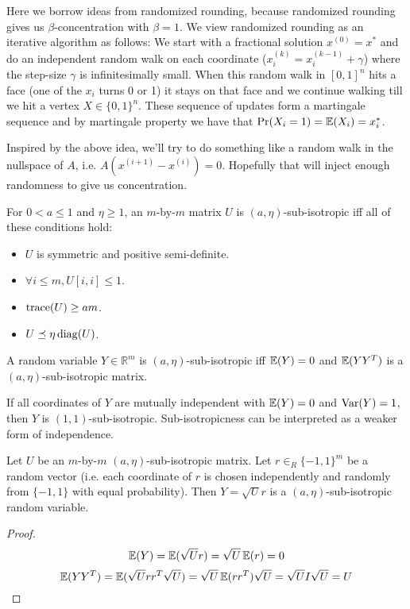 Here we borrow ideas from randomized rounding,
because randomized rounding gives us $\beta$-concentration with $\beta = 1$.
We view randomized rounding as an iterative algorithm as follows:
We start with a fractional solution $x^{(0)} = x^*$ and do an independent random walk
on each coordinate ($x_i^{(k)} = x_i^{(k-1)} + \gamma$)
where the step-size $\gamma$ is infinitesimally small.
When this random walk in $[0,1]^n$ hits a face (one of the $x_i$ turns 0 or 1)
it stays on that face and we continue walking till we hit a vertex $X \in \{0, 1\}^n$.
These sequence of updates form a martingale sequence and by martingale property
we have that $\Pr(X_i = 1) = \operatorname{\mathbb{E}}(X_i) = x_i^*$.

Inspired by the above idea, we'll try to do something like a random walk in the
nullspace of $A$, i.e. $A(x^{(i+1)} - x^{(i)}) = 0$.
Hopefully that will inject enough randomness to give us concentration.

\begin{definition}
For $0 < a \le 1$ and $\eta \ge 1$, an $m$-by-$m$ matrix $U$ is $(a, \eta)$-sub-isotropic
iff all of these conditions hold:
\begin{itemize}
\item $U$ is symmetric and positive semi-definite.
\item $\forall i \le m, U[i, i] \le 1$.
\item $\operatorname*{trace}(U) \ge am$.  %
\item $U \preceq \eta \operatorname*{diag}(U)$.  %
\end{itemize}
\end{definition}

\begin{definition}
A random variable $Y \in \mathbb{R}^m$ is $(a, \eta)$-sub-isotropic iff
$\operatorname{\mathbb{E}}(Y) = 0$ and $\operatorname{\mathbb{E}}(YY^T)$ is a $(a, \eta)$-sub-isotropic matrix.
\end{definition}
If all coordinates of $Y$ are mutually independent with $\operatorname{\mathbb{E}}(Y) = 0$ and $\operatorname*{Var}(Y) = 1$,
then $Y$ is $(1, 1)$-sub-isotropic.
Sub-isotropicness can be interpreted as a weaker form of independence.

\begin{theorem}
Let $U$ be an $m$-by-$m$ $(a, \eta)$-sub-isotropic matrix.
Let $r \in_R \{-1, 1\}^m$ be a random vector
(i.e. each coordinate of $r$ is chosen independently
and randomly from $\{-1, 1\}$ with equal probability).
Then $Y = \sqrt{U}r$ is a $(a, \eta)$-sub-isotropic random variable.
\end{theorem}
\begin{proof}
\[ \operatorname{\mathbb{E}}(Y) = \operatorname{\mathbb{E}}(\sqrt{U}r) = \sqrt{U}\operatorname{\mathbb{E}}(r) = 0 \]
\[ \operatorname{\mathbb{E}}(YY^T) = \operatorname{\mathbb{E}}(\sqrt{U}rr^T\sqrt{U}) = \sqrt{U}\operatorname{\mathbb{E}}(rr^T)\sqrt{U} = \sqrt{U}I\sqrt{U} = U \]
\end{proof}

